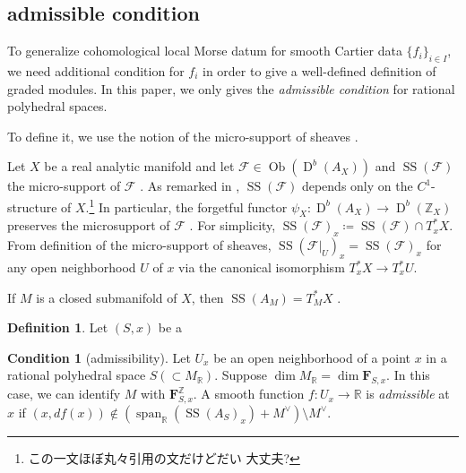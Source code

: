 \documentclass[a4paper,dvipdfmx,reqno,12pt]{amsart}
\theoremstyle{definition}
\newtheorem{Def}[Thm]{Definition}
\newtheorem{Rmk}[Thm]{Remark}
\newtheorem{Cond}[Thm]{Condition}
\newcommand{\deq}{\coloneqq}
\newcommand{\R}{\mathbb{R}}%
\newcommand{\Z}{\mathbb{Z}}%
\newcommand{\mcal}[1]{\mathcal{#1}}%
\newcommand{\opn}[1]{\operatorname{#1}}
\numberwithin{equation}{section}
\begin{document}
\subsection{admissible condition}

To generalize cohomological local Morse datum for
smooth Cartier data $\{f_i\}_{i\in I}$, we
need additional condition for $f_i$ in order 
to give a well-defined definition of graded modules.
In this paper, we only gives the \emph{admissible condition}
for rational polyhedral spaces.

To define it, we use the notion of the micro-support of
sheaves \cite[Chapter V]{MR1299726}.

Let $X$ be a real analytic manifold and let
$\mcal{F}\in\opn{Ob}(\opn{D}^{b}(A_X))$ and
$\opn{SS}(\mcal{F})$ the micro-support of $\mcal{F}$
\cite[Definition 5.1.2]{MR1299726}.
As remarked in \cite[Remark 5.1.6]{MR1299726},
$\opn{SS}(\mcal{F})$ depends only on the 
$C^{1}$-structure of $X$.\footnote{この一文ほぼ丸々引用の文だけどだい
大丈夫?}
In particular, 
the forgetful functor 
$\psi_X \colon \opn{D}^{b}(A_X)\to \opn{D}^{b}(\Z_X)$
preserves the microsupport of $\mcal{F}$ 
\cite[Remark 5.1.5]{MR1299726}.
For simplicity,
$\opn{SS}(\mcal{F})_x\deq \opn{SS}(\mcal{F}) \cap T^{*}_x X$.
From definition of the micro-support of sheaves, 
$\opn{SS}(\mcal{F}|_{U})_x=\opn{SS}(\mcal{F})_x$
for any open neighborhood $U$ of $x$ via the canonical 
isomorphism $T^{*}_xX\to T^{*}_xU$.

If $M$ is a closed submanifold of $X$, then
$\opn{SS}(A_M)=T^{*}_M X$ \cite[Proposition 5.3.2]{MR1299726}.

\begin{Def}
Let $(S,x)$ be a 
\end{Def}

\begin{Cond}[{admissibility}] \label{cond: admissible}
Let $U_x$ be an open neighborhood of a point $x$ in a rational polyhedral
space $S (\subset M_{\R})$. 
Suppose $\dim M_{\R}=\dim \mathbf{F}_{S,x}$. In this case,
we can identify $M$ with $\mathbf{F}_{S,x}^{\Z}$.
A smooth function $f\colon U_x \to \R$ is \emph{admissible} at $x$ 
if $(x,df(x))\notin (\opn{span}_{\R}(\opn{SS}(A_S)_x)+M^{\vee})\setminus M^{\vee}$.
\end{Cond}

\end{document}
